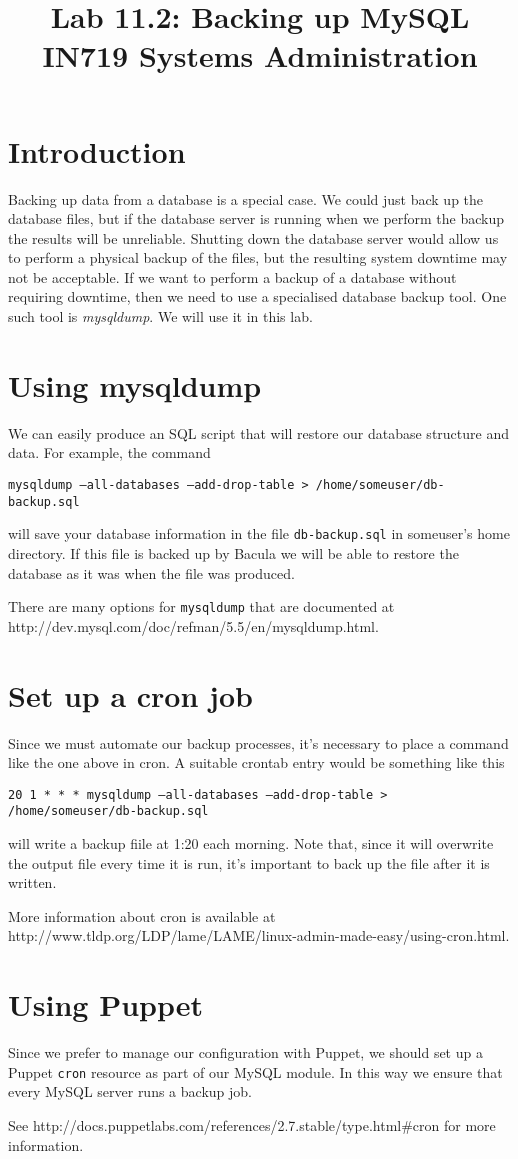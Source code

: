 \documentclass{article}   	%
\title{Lab 11.2:  Backing up MySQL\\ IN719 Systems Administration}
\date{}							%
\begin{document}
\maketitle

\section*{Introduction}
Backing up data from a database is a special case.  We could just back up the database files, but if the database server is running when we perform the backup the results will be unreliable. Shutting down the database server would allow us to perform a physical backup of the files, but the resulting system downtime may not be acceptable.  If we want to perform a backup of a database without requiring downtime, then we need to use a specialised database backup tool.  One such tool is \emph{mysqldump}.  We will use it in this lab.

\section{Using mysqldump}
We can easily produce an SQL script that will restore our database structure and data.  For example, the command

\texttt {mysqldump --all-databases --add-drop-table > /home/someuser/db-backup.sql}

will save your database information in the file \texttt{db-backup.sql} in someuser's home directory.  If this file is backed up by Bacula we will be able to restore the database as it was when the file was produced.

There are many options for \texttt{mysqldump} that are documented at http://dev.mysql.com/doc/refman/5.5/en/mysqldump.html.

\section{Set up a cron job}
Since we must automate our backup processes, it's necessary to place a command like the one above in cron.  A suitable crontab entry would be something like this

\texttt{20 1 * * *    mysqldump --all-databases --add-drop-table > /home/someuser/db-backup.sql}

will write a backup fiile at 1:20 each morning.  Note that, since it will overwrite the output file every time it is run, it's important to back up the file after it is written.

More information about cron is available at http://www.tldp.org/LDP/lame/LAME/linux-admin-made-easy/using-cron.html.

\section{Using Puppet}
Since we prefer to manage our configuration with Puppet, we should set up a Puppet \texttt{cron} resource as part of our MySQL module.  In this way we ensure that every MySQL server runs a backup job.

See http://docs.puppetlabs.com/references/2.7.stable/type.html\#cron for more information.
\end{document}
